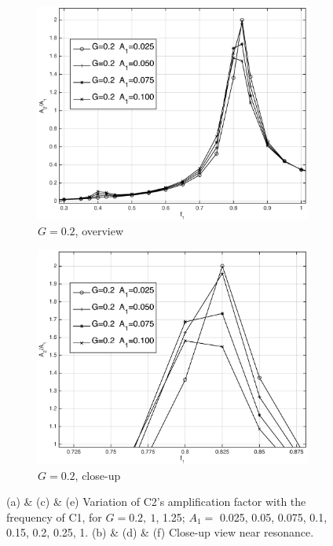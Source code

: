 \begin{figure}[p]
	\begin{subfigure}[t]{\widthp\textwidth}
		\centering
		\includegraphics[width=\linewidth]{Figs/G=0.2_A2dA1}
		\caption{$ G=0.2 $, overview}
		\label{fig:g0.2A2dA1}
	\end{subfigure}%
	\begin{subfigure}[t]{\widthp\textwidth}
		\centering
		\includegraphics[width=\linewidth]{Figs/G=0.2_A2dA1_details}
		\caption{$ G=0.2 $, close-up}
		\label{fig:g0.2A2dA1details}
	\end{subfigure}%
	\caption{
		(a) \& (c) \& (e) Variation of C2's amplification factor with the frequency of C1, for $G=0.2,\ 1$, 1.25; $A_1=$ 0.025, 0.05, 0.075, 0.1, 0.15, 0.2, 0.25, 1. (b) \& (d) \& (f) Close-up view near resonance. 
	}
		\label{fig:A2dA1}
\end{figure}

